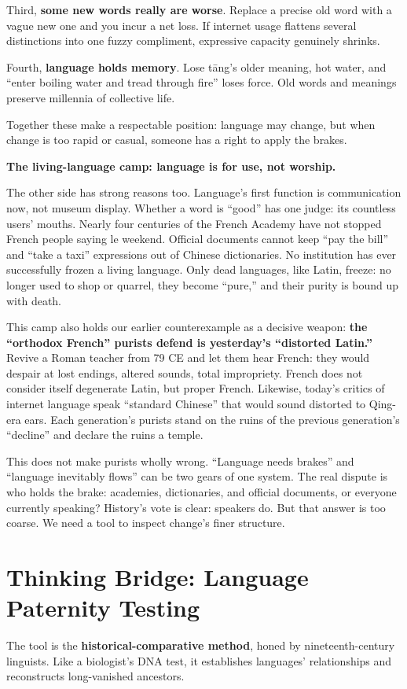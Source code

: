Third, \textbf{some new words really are worse}. Replace a precise old word with a vague new one and you incur a net loss. If internet usage flattens several distinctions into one fuzzy compliment, expressive capacity genuinely shrinks.

Fourth, \textbf{language holds memory}. Lose tāng's older meaning, hot water, and ``enter boiling water and tread through fire'' loses force. Old words and meanings preserve millennia of collective life.

Together these make a respectable position: language may change, but when change is too rapid or casual, someone has a right to apply the brakes.

\textbf{The living-language camp: language is for use, not worship.}

The other side has strong reasons too. Language's first function is communication now, not museum display. Whether a word is ``good'' has one judge: its countless users' mouths. Nearly four centuries of the French Academy have not stopped French people saying le weekend. Official documents cannot keep ``pay the bill'' and ``take a taxi'' expressions out of Chinese dictionaries. No institution has ever successfully frozen a living language. Only dead languages, like Latin, freeze: no longer used to shop or quarrel, they become ``pure,'' and their purity is bound up with death.

This camp also holds our earlier counterexample as a decisive weapon: \textbf{the ``orthodox French'' purists defend is yesterday's ``distorted Latin.''} Revive a Roman teacher from 79 CE and let them hear French: they would despair at lost endings, altered sounds, total impropriety. French does not consider itself degenerate Latin, but proper French. Likewise, today's critics of internet language speak ``standard Chinese'' that would sound distorted to Qing-era ears. Each generation's purists stand on the ruins of the previous generation's ``decline'' and declare the ruins a temple.

This does not make purists wholly wrong. ``Language needs brakes'' and ``language inevitably flows'' can be two gears of one system. The real dispute is who holds the brake: academies, dictionaries, and official documents, or everyone currently speaking? History's vote is clear: speakers do. But that answer is too coarse. We need a tool to inspect change's finer structure.

\section{Thinking Bridge: Language Paternity Testing}
The tool is the \textbf{historical-comparative method}, honed by nineteenth-century linguists. Like a biologist's DNA test, it establishes languages' relationships and reconstructs long-vanished ancestors.

